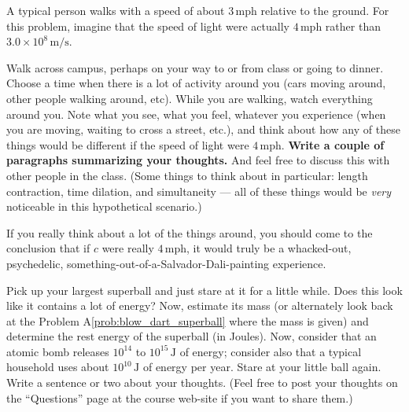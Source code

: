 \begin{exercise}
  A typical person walks with a speed of about $3\,\text{mph}$
  relative to the ground.  For this problem, imagine that the speed of
  light were actually $4\,\text{mph}$ rather than $3.0\times 10^8\,\text{m/s}$.

  Walk across campus, perhaps on your way to or from class or going to
  dinner.  Choose a time when there is a lot of activity around you
  (cars moving around, other people walking around, etc).  While you
  are walking, watch everything around you.  Note what you see, what
  you feel, whatever you experience (when you are moving, waiting to
  cross a street, etc.), and think about how any of these things would
  be different if the speed of light were $4\,\text{mph}$.  \textbf{    Write a couple of paragraphs summarizing your thoughts.}  And feel
  free to discuss this with other people in the class.  (Some things
  to think about in particular: length contraction, time dilation, and
  simultaneity --- all of these things would be \emph{very} noticeable
  in this hypothetical scenario.)

  If you really think about a lot of the things around, you should
  come to the conclusion that if $c$ were really $4\,\text{mph}$, it
  would truly be a whacked-out, psychedelic,
  something-out-of-a-Salvador-Dali-painting experience.
  \label{prob:rel_worldI}
\end{exercise}


\begin{exercise}  
  Pick up your largest superball and just stare at it for a little
  while.  Does this look like it contains a lot of energy?  Now,
  estimate its mass (or alternately look back at the Problem
  A\ref{prob:blow_dart_superball} where the mass is given) and
  determine the rest energy of the superball (in Joules).  Now,
  consider that an atomic bomb releases $10^{14}$ to
  $10^{15}\,\text{J}$ of energy; consider also that a typical household
  uses about $10^{10}\,\text{J}$ of energy per year.  Stare at your
  little ball again.  Write a sentence or two about your thoughts.
  (Feel free to post your thoughts on the ``Questions'' page at the
  course web-site if you want to share them.)
\end{exercise}

